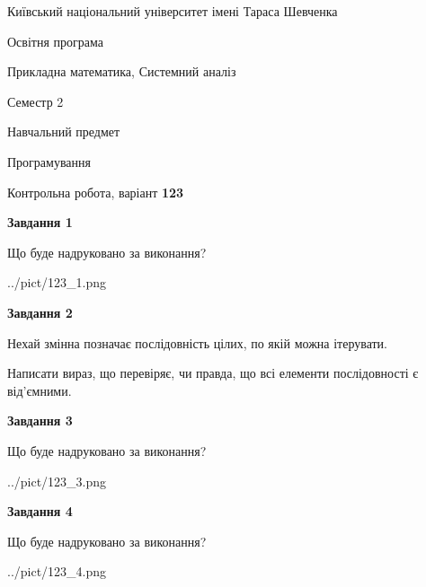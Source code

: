 \documentclass[12pt, ukrainian]{article}
\begin{document}
{{\begin {small}\par
{ \center  Київський національний університет імені Тараса Шевченка \par}
{\parbox {5 cm}{Освітня програма \hfill}{\parbox {8 cm}{Прикладна математика, Системний аналіз \hfill}}\parbox {5 cm}{\hfill Семестр 2}}\par
{\parbox {5 cm} {Навчальний предмет \hfill}\parbox {7 cm}{Програмування \hfill}\parbox {6cm}{\hfill}\par}\vspace{-7pt} \end{small}}{\center Контрольна робота, варіант  \No \textbf
{ 123 }\par}}
{
\begin {large}
{\begin {center}\textbf{Завдання 1}\end {center}}\par
Що буде надруковано за виконання?\par\par
\begin{center}
	{../pict/123_1.png}
\end{center}
\newpage

{\begin {center}\textbf{Завдання 2}\end {center}}\par
Нехай змінна  позначає послідовність цілих, по якій можна ітерувати.

Написати вираз, що перевіряє, чи правда, що всі елементи послідовності є від’ємни\-ми.\par
\newpage

{\begin {center}\textbf{Завдання 3}\end {center}}\par
Що буде надруковано за виконання?
\begin{center}
	{../pict/123_3.png}
\end{center}
\newpage

{\begin {center}\textbf{Завдання 4}\end {center}}\par
Що буде надруковано за виконання?\par
\begin{center}
	{../pict/123_4.png}
\end{center}
\newpage


\end{large}}
\end{document}
